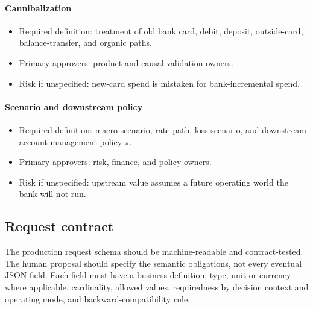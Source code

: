 \documentclass[11pt]{article}
\newcommand{\1}{\mathbf{1}}
\newcommand{\contractitem}[2]{\paragraph{#1}\begin{itemize}[leftmargin=1.5em,itemsep=0.12em,topsep=0.18em]#2\end{itemize}}
\begin{document}
\contractitem{Cannibalization}{
  \item Required definition: treatment of old bank card, debit, deposit,
        outside-card, balance-transfer, and organic paths.
  \item Primary approvers: product and causal validation owners.
  \item Risk if unspecified: new-card spend is mistaken for bank-incremental
        spend.
}
\contractitem{Scenario and downstream policy}{
  \item Required definition: macro scenario, rate path, loss scenario, and
        downstream account-management policy $\pi$.
  \item Primary approvers: risk, finance, and policy owners.
  \item Risk if unspecified: upstream value assumes a future operating world
        the bank will not run.
}

\subsection{Request contract}
\label{subsec:request-contract}

The production request schema should be machine-readable and contract-tested.
The human proposal should specify the semantic obligations, not every eventual
JSON field. Each field must have a business definition, type, unit or currency
where applicable, cardinality, allowed values, requiredness by decision context
and operating mode, and backward-compatibility rule.
\end{document}
